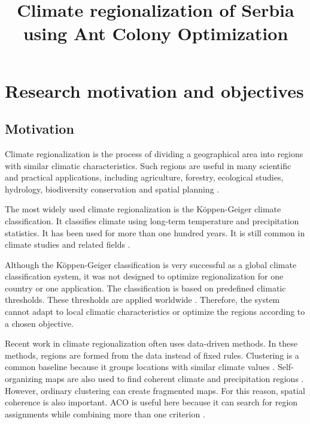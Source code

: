 \documentclass[11pt]{article}
\title{Climate regionalization of Serbia using Ant Colony Optimization}
\date{}
\begin{document}
\maketitle
\tableofcontents
\newpage

\section{Research motivation and objectives}
\label{sec:motivation}

\subsection{Motivation}

Climate regionalization is the process of dividing a geographical area into regions with similar climatic characteristics. Such regions are useful in many scientific and practical applications, including agriculture, forestry, ecological studies, hydrology, biodiversity conservation and spatial planning \cite{fovell1993,swenson2019}.

The most widely used climate regionalization is the Köppen-Geiger climate classification. It classifies climate using long-term temperature and precipitation statistics. It has been used for more than one hundred years. It is still common in climate studies and related fields \cite{koppen1936,peel2007,beck2018}.

Although the Köppen-Geiger classification is very successful as a global climate classification system, it was not designed to optimize regionalization for one country or one application. The classification is based on predefined climatic thresholds. These thresholds are applied worldwide \cite{koppen1936,peel2007}. Therefore, the system cannot adapt to local climatic characteristics or optimize the regions according to a chosen objective.

Recent work in climate regionalization often uses data-driven methods. In these methods, regions are formed from the data instead of fixed rules. Clustering is a common baseline because it groups locations with similar climate values \cite{fovell1993,carvalho2016}. Self-organizing maps are also used to find coherent climate and precipitation regions \cite{sheridan2011,swenson2019}. However, ordinary clustering can create fragmented maps. For this reason, spatial coherence is also important. ACO is useful here because it can search for region assignments while combining more than one criterion \cite{dorigo1996,dorigo2004}.
\end{document}
